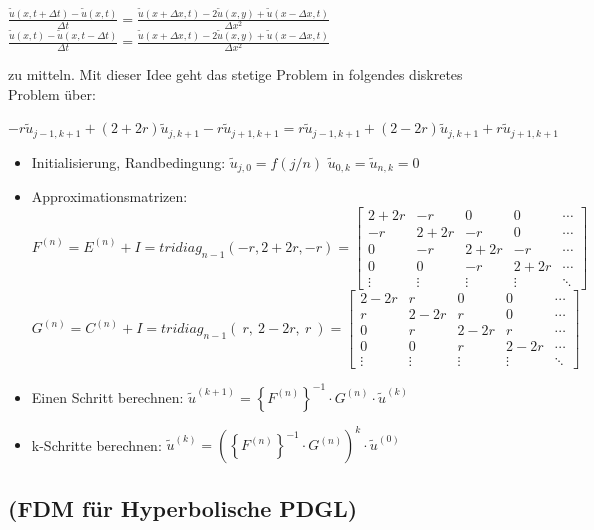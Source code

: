 $\boxed{\frac{\tilde{u}(x,t+\Delta t) - \tilde{u}(x,t)}{\Delta t} = 
\frac{\tilde{u}(x+\Delta x, t)-2\tilde{u}(x,y) + \tilde{u}( x - \Delta x, t )} {\Delta x^2}}$
$\boxed{\frac{\tilde{u}(x,t) - \tilde{u}(x,t -\Delta t)}{\Delta t} = 
\frac{\tilde{u}(x+\Delta x, t)-2\tilde{u}(x,y) + \tilde{u}( x - \Delta x, t )} {\Delta x^2}}$

zu mitteln. Mit dieser Idee geht das stetige Problem in folgendes diskretes Problem über:

$-r \tilde{u}_{j-1,k+1} + (2+2r)\tilde{u}_{j,k+1} - r \tilde{u}_{j+1,k+1} = r
\tilde{u}_{j-1,k+1} + (2-2r)\tilde{u}_{j,k+1} + r \tilde{u}_{j+1,k+1} $



\begin{itemize}
\item Initialisierung, Randbedingung: $\tilde{u}_{j,0}=f(j/n)$ \qquad $\tilde{u}_{0,k}=\tilde{u}_{n,k}=0$
\item Approximationsmatrizen:\\
$F^{(n)}=E^{(n)}+I=tridiag_{n-1}(-r,2+2r,-r)=\begin{bmatrix}
2+2r& -r	& 0		& 0 	&\cdots\\
-r	& 2+2r  & -r	& 0		&\cdots\\
0	& -r	& 2+2r 	& -r 	&\cdots\\
0	& 0		& -r	& 2+2r 	&\cdots\\
\vdots&	\vdots&\vdots&\vdots&\ddots	
\end{bmatrix}$\\
$G^{(n)}=C^{(n)}+I=tridiag_{n-1}(~r,~2-2r,~r~)=\begin{bmatrix}
2-2r& r		& 0		& 0 	&\cdots\\
r	& 2-2r  & r		& 0		&\cdots\\
0	& r		& 2-2r 	& r 	&\cdots\\
0	& 0		& r		& 2-2r 	&\cdots\\
\vdots&	\vdots&\vdots&\vdots&\ddots	
\end{bmatrix}$ 
\item Einen Schritt berechnen: $\tilde{u}^{(k+1)}=\left\{F^{(n)}\right\}^{-1} \cdot G^{(n)}\cdot \tilde{u}^{(k)}$
\item k-Schritte berechnen: $\tilde{u}^{(k)}=\left(\left\{F^{(n)}\right\}^{-1} \cdot G^{(n)}\right)^{k}\cdot \tilde{u}^{(0)}$
\end{itemize}

\subsection{(FDM für Hyperbolische PDGL)}

